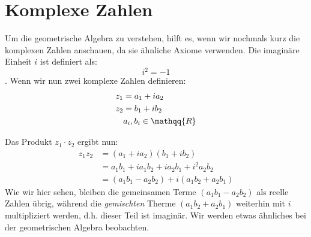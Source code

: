 %
%
%
%
\section{Komplexe Zahlen
\label{geoalgebra:section:teil1}}
Um die geometrische Algebra zu verstehen, hilft es, wenn wir nochmals kurz die komplexen Zahlen anschauen, da sie ähnliche Axiome verwenden.
Die imaginäre Einheit $i$ ist definiert als:
\begin{equation}
  i^2 = -1
\end{equation}.
Wenn wir nun zwei komplexe Zahlen definieren:
\begin{align*}
  z_1 &= a_1 + i a_2 \\
  z_2 &= b_1 + i b_2 \\ 
  &a_i, b_i \in \mathqq{R}
\end{align*}

Das Produkt $z_1 \cdot{} z_2$ ergibt nun:
\begin{align*}
  z_1 z_2 &= (a_1 + i a_2) (b_1 + i b_2) \\
  &= a_1 b_1 + i a_1 b_2 + i a_2 b_1 + i^2 a_2 b_2 \\
  &= (a_1 b_1 - a_2 b_2) + i (a_1 b_2 + a_2 b_1)
\end{align*}
Wie wir hier sehen, bleiben die gemeinsamen Terme $(a_1 b_1 - a_2 b_2)$ als reelle Zahlen übrig, während die \emph{gemischten} Therme $(a_1 b_2 + a_2 b_1)$ weiterhin mit $i$
multipliziert werden, d.h. dieser Teil ist imaginär. Wir werden etwas ähnliches bei der geometrischen Algebra beobachten.




